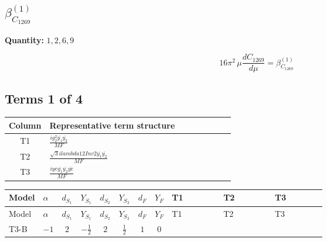 \documentclass[8pt]{article}
\begin{document}
\begin{landscape}
\section*{$\beta_{C_{1269}}^{(1)}$}
\noindent\textbf{Quantity: }$\mathrm{1,2,6,9}$\par\smallskip
\[16\pi^2\,\mu\frac{d C_{1269}}{d\mu}=\beta_{C_{1269}}^{(1)}\]
\subsection*{Terms 1 of 4}
\begin{center}
\begin{tabular}{@{}c >{\raggedright\arraybackslash}p{0.82\linewidth}@{}}
\toprule
Column & Representative term structure \\
\midrule
T1 & \(\displaystyle \frac{i g_{2}^{2} \overline{y_{1}} \overline{y_{2}}}{MF}\) \\
\midrule
T2 & \(\displaystyle \frac{\sqrt{3} i lambda12Inv2 \overline{y_{1}} \overline{y_{2}}}{MF}\) \\
\midrule
T3 & \(\displaystyle \frac{i ye \overline{y_{1}} \overline{y_{2}} \overline{ye}}{MF}\) \\
\midrule
\bottomrule
\end{tabular}
\end{center}
\smallskip
\tiny
\begin{longtable}{@{}llcccccc >{\raggedright\arraybackslash}p{0.21\linewidth} >{\raggedright\arraybackslash}p{0.21\linewidth} >{\raggedright\arraybackslash}p{0.21\linewidth}@{}}
\toprule
Model & $\alpha$ & $d_{S_1}$ & $Y_{S_1}$ & $d_{S_2}$ & $Y_{S_2}$ & $d_F$ & $Y_F$ & T1 & T2 & T3 \\
\midrule
\endfirsthead
\toprule
Model & $\alpha$ & $d_{S_1}$ & $Y_{S_1}$ & $d_{S_2}$ & $Y_{S_2}$ & $d_F$ & $Y_F$ & T1 & T2 & T3 \\
\midrule
\endhead
T3-B & $-1$ & $2$ & $-\frac{1}{2}$ & $2$ & $\frac{1}{2}$ & $1$ & $0$ & \scriptsize\adjustbox{max width=\linewidth}{$\begin{gathered} - \frac{3 i g_{2}^{2} \overline{y_{1}} \overline{y_{2}}}{8 MF}\end{gathered}$} & \scriptsize\adjustbox{max width=\linewidth}{$\begin{gathered} - \frac{\sqrt{3} i lambda12Inv2 \overline{y_{1}} \overline{y_{2}}}{6 MF}\end{gathered}$} & \scriptsize\adjustbox{max width=\linewidth}{$\begin{gathered} \frac{i ye \overline{y_{1}} \overline{y_{2}} \overline{ye}}{8 MF}\end{gathered}$} \\

\end{longtable}
\end{landscape}
\end{document}
